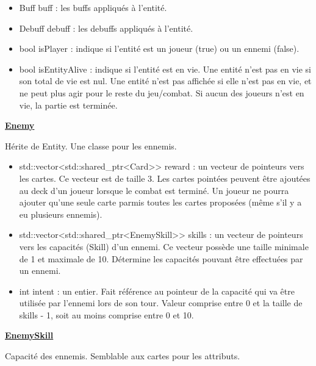 \begin{itemize}
    \item Buff buff : les buffs appliqués à l'entité.
    \item Debuff debuff : les debuffs appliqués à l'entité.
    \item bool isPlayer : indique si l'entité est un joueur (true) ou un ennemi (false).
    \item bool isEntityAlive : indique si l'entité est en vie. Une entité n'est pas en vie si son total de vie est nul. Une entité n'est pas affichée si elle n'est pas en vie, et ne peut plus agir pour le reste du jeu/combat. Si aucun des joueurs n'est en vie, la partie est terminée.
\end{itemize}


\underline{\textbf{Enemy}}
\par Hérite de Entity. Une classe pour les ennemis.
\begin{itemize}
    \item std::vector<std::shared\_ptr<Card>> reward : un vecteur de pointeurs vers les cartes. Ce vecteur est de taille 3. Les cartes pointées peuvent être ajoutées au deck d'un joueur lorsque le combat est terminé. Un joueur ne pourra ajouter qu'une seule carte parmis toutes les cartes proposées (même s'il y a eu plusieurs ennemis).
    \item std::vector<std::shared\_ptr<EnemySkill>>  skills : un vecteur de pointeurs vers les capacités (Skill) d'un ennemi. Ce vecteur possède une taille minimale de 1 et maximale de 10. Détermine les capacités pouvant être effectuées par un ennemi.
    \item int intent : un entier. Fait référence au pointeur de la capacité qui va être utilisée par l'ennemi lors de son tour. Valeur comprise entre 0 et la taille de skills - 1, soit au moins comprise entre 0 et 10.
\end{itemize}

\underline{\textbf{EnemySkill}}
\par Capacité des ennemis. Semblable aux cartes pour les attributs.

